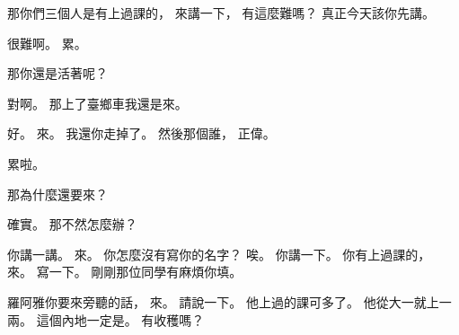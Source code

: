 \hypertarget{w01:cue:3376}{}那你們三個人是有上過課的，
\hypertarget{w01:cue:3377}{}來講一下，
\hypertarget{w01:cue:3378}{}有這麼難嗎？
\hypertarget{w01:cue:3379}{}真正今天該你先講。

\hypertarget{w01:cue:3380}{}很難啊。
\hypertarget{w01:cue:3381}{}累。

\hypertarget{w01:cue:3382}{}那你還是活著呢？

\hypertarget{w01:cue:3383}{}對啊。
\hypertarget{w01:cue:3384}{}那上了臺鄉車我還是來。

\hypertarget{w01:cue:3385}{}好。
\hypertarget{w01:cue:3386}{}來。
\hypertarget{w01:cue:3387}{}我還你走掉了。
\hypertarget{w01:cue:3388}{}然後那個誰，
\hypertarget{w01:cue:3389}{}正偉。

\hypertarget{w01:cue:3390}{}累啦。

\hypertarget{w01:cue:3391}{}那為什麼還要來？

\hypertarget{w01:cue:3392}{}確實。
\hypertarget{w01:cue:3393}{}那不然怎麼辦？

\hypertarget{w01:cue:3394}{}你講一講。
\hypertarget{w01:cue:3395}{}來。
\hypertarget{w01:cue:3396}{}你怎麼沒有寫你的名字？
\hypertarget{w01:cue:3397}{}唉。
\hypertarget{w01:cue:3398}{}你講一下。
\hypertarget{w01:cue:3399}{}你有上過課的，
\hypertarget{w01:cue:3400}{}來。
\hypertarget{w01:cue:3401}{}寫一下。
\hypertarget{w01:cue:3402}{}剛剛那位同學有麻煩你填。

\hypertarget{w01:cue:3403}{}羅阿雅你要來旁聽的話，
\hypertarget{w01:cue:3404}{}來。
\hypertarget{w01:cue:3405}{}請說一下。
\hypertarget{w01:cue:3406}{}他上過的課可多了。
\hypertarget{w01:cue:3407}{}他從大一就上一兩。
\hypertarget{w01:cue:3408}{}這個內地一定是。
\hypertarget{w01:cue:3409}{}有收穫嗎？

